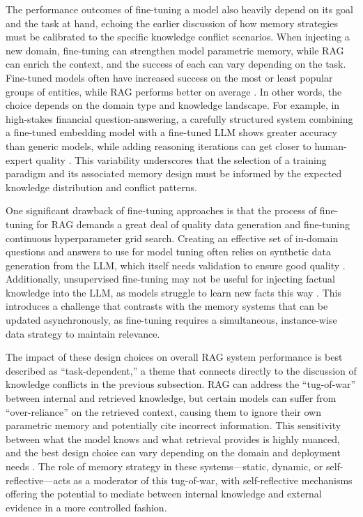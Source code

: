 \documentclass[11pt]{article}
\begin{document}
The performance outcomes of fine-tuning a model also heavily depend on its goal and the task at hand, echoing the earlier discussion of how memory strategies must be calibrated to the specific knowledge conflict scenarios. When injecting a new domain, fine-tuning can strengthen model parametric memory, while RAG can enrich the context, and the success of each can vary depending on the task. Fine-tuned models often have increased success on the most or least popular groups of entities, while RAG performs better on average \cite{ref25}. In other words, the choice depends on the domain type and knowledge landscape. For example, in high-stakes financial question-answering, a carefully structured system combining a fine-tuned embedding model with a fine-tuned LLM shows greater accuracy than generic models, while adding reasoning iterations can get closer to human-expert quality \cite{ref71}. This variability underscores that the selection of a training paradigm and its associated memory design must be informed by the expected knowledge distribution and conflict patterns.

One significant drawback of fine-tuning approaches is that the process of fine-tuning for RAG demands a great deal of quality data generation and fine-tuning continuous hyperparameter grid search. Creating an effective set of in-domain questions and answers to use for model tuning often relies on synthetic data generation from the LLM, which itself needs validation to ensure good quality \cite{ref72}. Additionally, unsupervised fine-tuning may not be useful for injecting factual knowledge into the LLM, as models struggle to learn new facts this way \cite{ref30}. This introduces a challenge that contrasts with the memory systems that can be updated asynchronously, as fine-tuning requires a simultaneous, instance-wise data strategy to maintain relevance.

The impact of these design choices on overall RAG system performance is best described as ``task-dependent,'' a theme that connects directly to the discussion of knowledge conflicts in the previous subsection. RAG can address the ``tug-of-war'' between internal and retrieved knowledge, but certain models can suffer from ``over-reliance'' on the retrieved context, causing them to ignore their own parametric memory and potentially cite incorrect information. This sensitivity between what the model knows and what retrieval provides is highly nuanced, and the best design choice can vary depending on the domain and deployment needs \cite{ref37,ref72}. The role of memory strategy in these systems---static, dynamic, or self-reflective---acts as a moderator of this tug-of-war, with self-reflective mechanisms offering the potential to mediate between internal knowledge and external evidence in a more controlled fashion.
\end{document}
